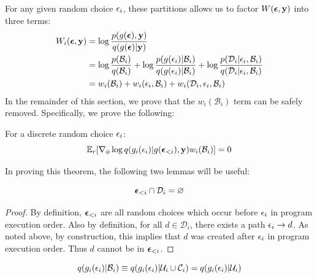 For any given random choice $\epsilon_i$, these partitions allows us to factor $W(\bm{\epsilon}, \mathbf{y})$ into three terms:
\begin{align*}
W_i(\reparamVars, \observedVars)
%
&= \log \frac{p(\xformedVars, \observedVars)}{\guide(\xformedVars | \observedVars)}\\
%
&= \log \frac{p(\mathcal{B}_i)}{\guide(\mathcal{B}_i)} + \log \frac{p( \reparamXform(\reparamVar_i) | \mathcal{B}_i)}{\guide(\reparamXform(\reparamVar_i) | \mathcal{B}_i)}	+ \log \frac{p(\mathcal{D}_i | \reparamVar_i, \mathcal{B}_i)}{\guide(\mathcal{D}_i | \reparamVar_i, \mathcal{B}_i)}\\
%
&= w_i(\mathcal{B}_i) + w_i(\reparamVar_i, \mathcal{B}_i) + w_i(\mathcal{D}_i, \reparamVar_i, \mathcal{B}_i)
\end{align*}
In the remainder of this section, we prove that the $w_i(\mathcal{B}_i)$ term can be safely removed. Specifically, we prove the following:
\begin{theorem}
For a discrete random choice $\epsilon_i$:
\begin{equation*}
\mathbb{E}_{r} [ \nabla_\phi \log q(g_i(\epsilon_i) | g(\bm{\epsilon}_{<i}), \mathbf{y}) w_i(\mathcal{B}_i) ] = 0
\end{equation*}
\label{thm:wterms}
\end{theorem}
In proving this theorem, the following two lemmas will be useful:
\begin{lemma}
\begin{equation*}
\bm{\epsilon}_{<i} \cap \mathcal{D}_i = \varnothing
\end{equation*}
\label{lem:depsDisjoint}
\end{lemma}
%
\begin{proof}
By definition, $\bm{\epsilon}_{<i}$ are all random choices which occur before $\epsilon_i$ in program execution order. Also by definition, for all $d \in \mathcal{D}_i$, there exists a path $\epsilon_i \to d$. As noted above, by construction, this implies that $d$ was created after $\epsilon_i$ in program execution order. Thus $d$ cannot be in $\bm{\epsilon}_{<i}$.
\end{proof}
\begin{lemma}
\begin{equation*}
q(g_i(\epsilon_i) | \mathcal{B}_i) \equiv q(g_i(\epsilon_i) | \mathcal{U}_i \cup \mathcal{C}_i) = q(g_i(\epsilon_i) | \mathcal{U}_i)
\end{equation*}
\label{lem:bIndependentFromU}
\end{lemma}
